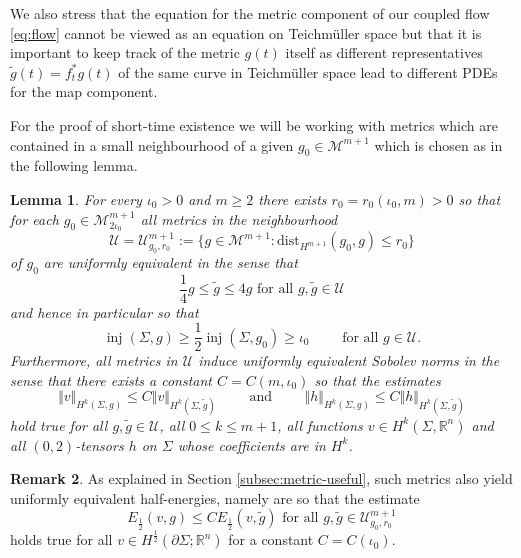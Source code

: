 \documentclass[10pt,reqno]{amsart}
\theoremstyle{plain}
\newtheorem{lemma}{Lemma}[section]
\theoremstyle{definition}
\newtheorem{rmk}[lemma]{Remark}
\numberwithin{equation}{section}
\newcommand{\Si}{\Sigma}
\newcommand{\R}{\ensuremath{{\mathbb R}}}
\DeclareMathOperator{\inj}{inj}
\newcommand{\norm}[1]{\Vert#1\Vert}
\newcommand{\beq}{\begin{equation}}
\newcommand{\eeq}{\end{equation}}
\newcommand{\half}{\frac{1}{2}}
\newcommand{\M}{\ensuremath{{\mathcal M}}}
\newcommand{\dist}{\text{dist}}
\newcommand{\pSi}{{\partial \Sigma}}
\newcommand{\MM}{\mathcal{M}} %
\newcommand{\UU}{{\mathcal U}}
\newcommand{\hf}{\frac{1}{2}} %
\newcommand{\MMtwoiota}{\MM_{2\iota_0}}
\begin{document}
We also stress that the equation for  the metric component of our coupled flow \eqref{eq:flow} cannot be viewed as an equation on Teichm\"uller space but that it is important to keep track of the metric $g(t)$ itself as different representatives $\tilde g(t) =f_t^*g(t)$ of the same curve in Teichm\"uller space lead to different PDEs for the map component.

For the proof of short-time existence we will be working with metrics which are contained in a small neighbourhood of a given $g_0\in \M^{m+1}$ which is chosen as in the following lemma. 
\begin{lemma}\label{lemma:U-basics}
    For every $\iota_0>0$ and $m\geq 2$ there exists $r_0=r_0(\iota_0,m)>0$ so that for each $g_0\in \MMtwoiota^{m+1}$ 
    all metrics in the neighbourhood
    \beq\label{def:U}
        \UU=\UU_{g_0,r_0}^{m+1}:=\{g\in  \MM^{m+1}: \dist_{H^{m+1}}(g_0,g)\leq r_0\}
    \eeq
    of $g_0$ are uniformly equivalent in the sense that 
    \beq\label{est:U-equiv} 
        \frac14 g\leq \tilde g\leq 4 g \text{ for all } g,\tilde g\in \UU
    \eeq
    and hence in particular so that %
    \beq\label{est:U-inj-bound} 
        \inj(\Si,g)\geq \half \inj(\Si,g_0) \geq \iota_0 \qquad\text{ for all } g\in \UU.
    \eeq
    Furthermore, all metrics in $\UU$ induce uniformly equivalent Sobolev norms in the sense that there exists a constant $C=C(m,\iota_0)$ so that the estimates 
    \beq\label{est:equiv-Hm-new}
        \norm{v}_{H^k(\Si,g)}\leq C\norm{v}_{H^k(\Si,\tilde g)} \qquad \text{ and }\qquad  \norm{h}_{H^k(\Si,g)}\leq C\norm{h}_{H^k(\Si,\tilde g)} 
    \eeq
    hold true for all $g,\tilde g\in \UU$, all $0\leq k\leq m+1$, all functions $v\in H^k(\Si,\R^n)$ and all $(0,2)$-tensors $h$ on $\Si$ whose coefficients are in $H^k$. 
\end{lemma}

\begin{rmk}\label{rmk:half-energy-uniform}
    As explained in Section \ref{subsec:metric-useful}, such metrics also yield uniformly equivalent half-energies, namely are so that the estimate 
    \beq
        E_\hf(v,g) \leq CE_\hf(v,\tilde{g}) \text{ for all } g,\tilde g\in \UU_{g_0,r_0}^{m+1}
    \eeq
    holds true for all $v\in H^\half(\pSi;\R^n)$ for a constant $C=C(\iota_0)$.
\end{rmk}
\end{document}
